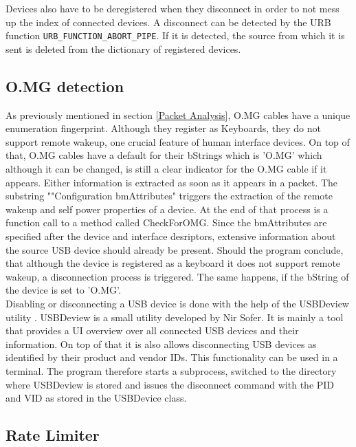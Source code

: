 Devices also have to be deregistered when they disconnect in order to not mess up the index of connected devices. A disconnect can be detected by the URB function \verb|URB_FUNCTION_ABORT_PIPE|. If it is detected, the source from which it is sent is deleted from the dictionary of registered devices.


\subsection{O.MG detection}

As previously mentioned in section \ref{Packet Analysis}, O.MG cables have a unique enumeration fingerprint. Although they register as Keyboards, they do not support remote wakeup, one crucial feature of human interface devices. On top of that, O.MG cables have a default for their bStrings which is 'O.MG' which although it can be changed, is still a clear indicator for the O.MG cable if it appears. Either information is extracted as soon as it appears in a packet. The substring ""Configuration bmAttributes" triggers the extraction of the remote wakeup and self power properties of a device. At the end of that process is a function call to a method called CheckForOMG. Since the bmAttributes are specified after the device and interface desriptors, extensive information about the source USB device should already be present. Should the program conclude, that although the device is registered as a keyboard it does not support remote wakeup, a disconnection process is triggered. The same happens, if the bString of the device is set to 'O.MG'. \\
Disabling or disconnecting a USB device is done with the help of the USBDeview utility \cite{ViewAnyInstalled}. USBDeview is a small utility developed by Nir Sofer. It is mainly a tool that provides a UI overview over all connected USB devices and their information. On top of that it is also allows disconnecting USB devices as identified by their product and vendor IDs. This functionality can be used in a terminal. The program therefore starts a subprocess, switched to the directory where USBDeview is stored and issues the disconnect command with the PID and VID as stored in the USBDevice class.

\subsection{Rate Limiter}

